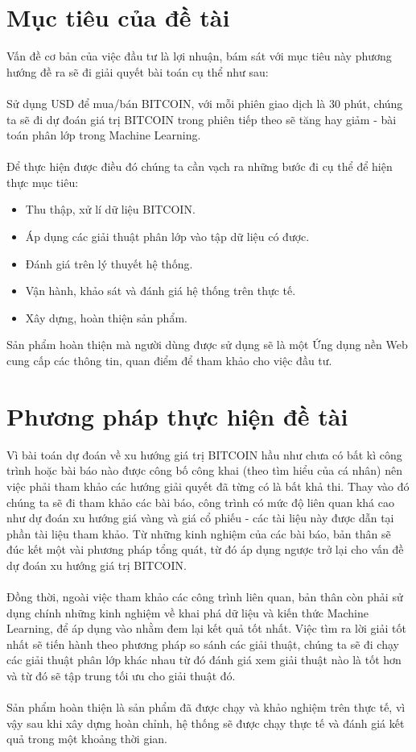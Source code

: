 \section{Mục tiêu của đề tài}
Vấn đề cơ bản của việc đầu tư là lợi nhuận, bám sát với mục tiêu này phương hướng 
đề ra sẽ đi giải quyết bài toán cụ thể như sau:\\\\
Sử dụng USD để mua/bán BITCOIN, với mỗi phiên giao dịch là 30 phút, chúng 
ta sẽ đi dự đoán giá trị BITCOIN trong phiên tiếp theo sẽ tăng hay giảm - bài
toán phân lớp trong Machine Learning.\\\\
Để thực hiện được điều đó chúng ta cần vạch ra những bước đi cụ
thể để hiện thực mục tiêu:
\begin{itemize}
  \item Thu thập, xử lí dữ liệu BITCOIN.
  \item Áp dụng các giải thuật phân lớp vào tập dữ liệu có được.
  \item Đánh giá trên lý thuyết hệ thống.
  \item Vận hành, khảo sát và đánh giá hệ thống trên thực tế.
  \item Xây dựng, hoàn thiện sản phẩm.
\end{itemize} 
Sản phẩm hoàn thiện mà người dùng được sử dụng sẽ là một Ứng dụng nền Web cung 
cấp các thông tin, quan điểm để tham khảo cho việc đầu tư.
\section{Phương pháp thực hiện đề tài}
Vì bài toán dự đoán về xu hướng giá trị BITCOIN hầu như chưa có bất kì 
công trình hoặc bài báo nào được công bố công khai (theo tìm hiểu của cá nhân) 
nên việc phải tham khảo các hướng giải quyết đã từng có là bất khả thi. Thay vào 
đó chúng ta sẽ đi tham khảo các bài báo, công trình có mức độ liên quan khá cao 
như dự đoán xu hướng giá vàng và giá cổ phiếu - các tài liệu này được dẫn tại 
phần tài liệu tham khảo.
Từ những kinh nghiệm của các bài báo, bản thân sẽ đúc kết một vài phương pháp 
tổng quát, từ đó áp dụng ngược trở lại cho vấn đề dự đoán xu hướng giá trị 
BITCOIN.\\\\
Đồng thời, ngoài việc tham khảo các công trình liên quan, bản thân còn phải 
sử dụng chính những kinh nghiệm về khai phá dữ liệu và kiến thức Machine Learning, 
để áp dụng vào nhằm đem lại kết quả tốt nhất. Việc tìm ra lời giải tốt nhất sẽ 
tiến hành theo phương pháp so sánh các giải thuật, chúng ta sẽ đi chạy các giải 
thuật phân lớp khác nhau từ đó đánh giá xem giải thuật nào là tốt hơn và từ đó 
sẽ tập trung tối ưu cho giải thuật đó.\\\\
Sản phẩm hoàn thiện là sản phẩm đã được chạy và khảo nghiệm trên thực tế, vì vậy 
sau khi xây dựng hoàn chỉnh, hệ thống sẽ được chạy thực tế và đánh giá kết quả 
trong một khoảng thời gian.
